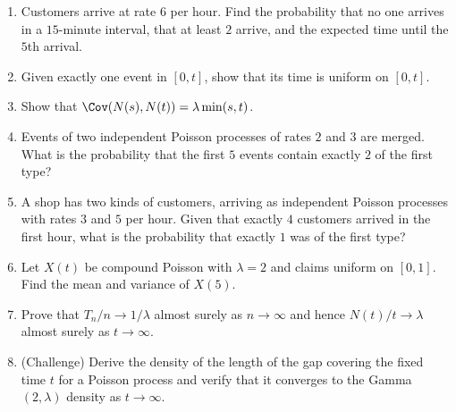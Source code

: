 \begin{enumerate}
\item Customers arrive at rate $6$ per hour. Find the probability that no one arrives
in a $15$-minute interval, that at least $2$ arrive, and the expected time until the $5$th
arrival.
\item Given exactly one event in $[0,t]$, show that its time is uniform on $[0,t]$.
\item Show that $\Cov(N(s),N(t))=\lambda\min(s,t)$.
\item Events of two independent Poisson processes of rates $2$ and $3$ are merged. What is
the probability that the first $5$ events contain exactly $2$ of the first type?
\item A shop has two kinds of customers, arriving as independent Poisson processes with
rates $3$ and $5$ per hour. Given that exactly $4$ customers arrived in the first hour,
what is the probability that exactly $1$ was of the first type?
\item Let $X(t)$ be compound Poisson with $\lambda=2$ and claims uniform on $[0,1]$. Find the
mean and variance of $X(5)$.
\item Prove that $T_n/n\to1/\lambda$ almost surely as $n\to\infty$ and hence
$N(t)/t\to\lambda$ almost surely as $t\to\infty$.
\item (Challenge) Derive the density of the length of the gap covering the fixed time $t$
for a Poisson process and verify that it converges to the Gamma$(2,\lambda)$ density as
$t\to\infty$.
\end{enumerate}
